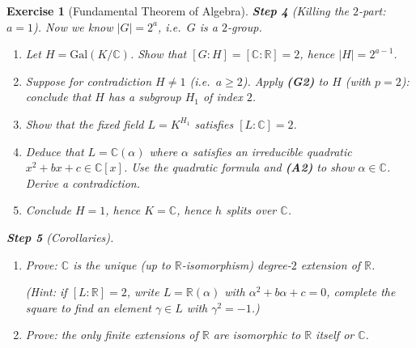 \documentclass{article}
\newtheorem{exer}{Exercise}
\newcommand{\C}{\mathbb{C}}
\newcommand{\R}{\mathbb{R}}
\begin{document}
\begin{exer}[Fundamental Theorem of Algebra]
\medskip
\noindent\textbf{Step 4} (Killing the $2$-part: $a=1$).\;
Now we know $|G|=2^a$, i.e.\ $G$ is a $2$-group.
\begin{enumerate}
\item[(a)] Let $H=\mathrm{Gal}(K/\C)$. Show that $[G:H]=[\C:\R]=2$, hence $|H|=2^{a-1}$.

\item[(b)] Suppose for contradiction  $H\neq 1$ (i.e.\ $a\ge 2$). Apply \textbf{(G2)} to $H$ (with $p=2$): conclude that $H$ has a subgroup $H_1$ of index $2$.

\item[(c)] Show that the fixed field $L=K^{H_1}$ satisfies $[L:\C]=2$.

\item[(d)] Deduce that $L=\C(\alpha)$ where $\alpha$ satisfies an irreducible quadratic $x^2+bx+c\in\C[x]$. Use the quadratic formula and \textbf{(A2)} to show $\alpha\in\C$. Derive a contradiction.

\item[(e)] Conclude $H=1$, hence $K=\C$, hence $h$ splits over $\C$.
\end{enumerate}

\medskip
\noindent\textbf{Step 5} (Corollaries).
\begin{enumerate}
\item[(a)] Prove: $\C$ is the unique (up to $\R$-isomorphism) degree-$2$ extension of $\R$.

(Hint: if $[L:\R]=2$, write $L=\R(\alpha)$ with $\alpha^2+b\alpha+c=0$, complete the square to find an element $\gamma\in L$ with $\gamma^2=-1$.)

\item[(b)] Prove: the \emph{only} finite extensions of $\R$ are isomorphic to $\R$ itself or $\C$.

\end{enumerate}
\end{exer}
\end{document}
